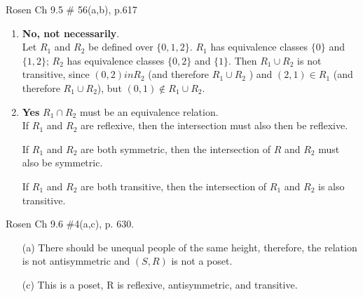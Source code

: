 \begin{questions}
    \ifprintanswers
        \vspace{-10pt}
    \fi
{} Rosen Ch 9.5 \# 56(a,b), p.617
    \ifprintanswers
        \vspace{-15pt}
    \fi
    \begin{solution}
    	\begin{enumerate}[label=(\alph*),itemsep=1pt,topsep=0pt]
    		\item \textbf{No, not necessarily}. \\
    		Let $R_1$ and $R_2$ be defined over $\{0,1,2\}$. $R_1$ has equivalence classes $\{0\}$ and $\{1,2\}$; $R_2$ has equivalence classes $\{0,2\}$ and $\{1\}$. Then $R_1 \cup R_2$ is not transitive, since $(0, 2) in R_2$ (and therefore $R_1 \cup R_2$ ) and $(2, 1) \in  R_1$ (and therefore $R_1 \cup R_2$), but $(0, 1) \not\in R_1 \cup R_2$.

    		\item \textbf{Yes} $R_1 \cap R_2$ must be an equivalence relation. \\
    		If $R_1$ and $R_2$ are reflexive, then the intersection must also then be reflexive. 

		    If $R_1$ and $R_2$ are both symmetric, then the intersection of $R$ and $R_2$ must also be symmetric.

		    If $R_1$ and $R_2$ are both transitive, then the intersection of $R_1$ and $R_2$ is also transitive.

    	\end{enumerate}
    \end{solution}


    \ifprintanswers
        \vspace{-10pt}
    \fi
{} Rosen Ch 9.6 \#4(a,c), p. 630.
    \ifprintanswers
        \vspace{-15pt}
    \fi
    \begin{solution}
    \begin{itemize}[itemsep=0pt,parsep=0pt,topsep=0pt,partopsep=0pt]
        \item[(a)] There should be unequal people of the same height, therefore, the relation is not antisymmetric and $(S, R)$ is not a poset.
        \item[(c)] This is a poset, R is reflexive, antisymmetric, and transitive.
    \end{itemize}
    \end{solution}






\end{questions}
